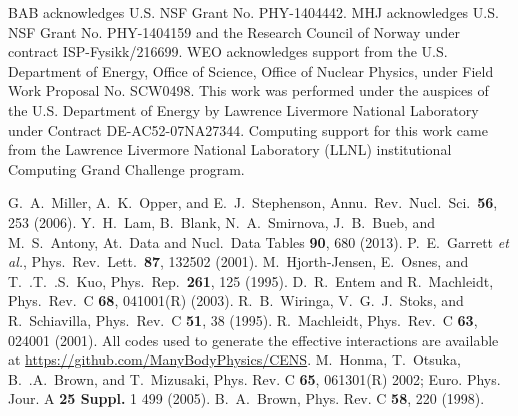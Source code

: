 \documentclass[
10pt,
showpacs,preprintnumbers,footinbib,
amsmath,amssymb,
aps,
prl,twocolumn,groupedaddress,superscriptaddress,
showkeys
]{revtex4-1}
\begin{document}
BAB acknowledges U.S. NSF Grant No. PHY-1404442. MHJ acknowledges U.S. NSF Grant No. PHY-1404159 and  the Research Council of Norway under contract ISP-Fysikk/216699. WEO acknowledges  support from the U.S. Department of Energy, Office of Science, Office of Nuclear Physics, under Field Work Proposal No. SCW0498. This work was performed under the auspices of the U.S. Department of Energy by Lawrence Livermore National Laboratory under Contract DE-AC52-07NA27344.  Computing support for this work came from the Lawrence Livermore National Laboratory (LLNL) institutional Computing Grand Challenge program. 

\begin{thebibliography}{99}
 G.~A.~Miller, A.~K.~Opper, and E.~J.~Stephenson, Annu.~Rev.~Nucl.~Sci.~{\bf 56}, 253 (2006).
 Y.~H.~Lam, B.~Blank, N.~A.~Smirnova, J.~B.~Bueb, and M.~S.~Antony, At.~Data and Nucl.~Data Tables {\bf 90}, 680 (2013). 
 P.~E.~Garrett {\em et al.}, Phys.~Rev.~Lett.~{\bf 87}, 132502 (2001). 
 M.~Hjorth-Jensen, E.~Osnes, and T.~.T.~.S.~Kuo, Phys.~Rep.~{\bf 261}, 125 (1995).
 D.~R.~Entem and R.~Machleidt, Phys.~Rev.~C {\bf 68}, 041001(R) (2003).
 R.~B.~Wiringa, V.~G.~J.~Stoks, and R.~Schiavilla, Phys.~Rev.~C {\bf 51}, 38 (1995).
 R.~Machleidt, Phys.~Rev.~C {\bf 63}, 024001 (2001).
 All codes used to generate the effective interactions are available at \url{ https://github.com/ManyBodyPhysics/CENS}.
 M.~Honma, T.~Otsuka, B.~.A.~Brown, and T.~Mizusaki, Phys. Rev. C {\bf 65}, 061301(R) 2002;
Euro. Phys. Jour. A {\bf 25 Suppl.} 1 499 (2005).
B.~A.~Brown, Phys. Rev. C {\bf 58}, 220 (1998).
\end{thebibliography}
\end{document}
